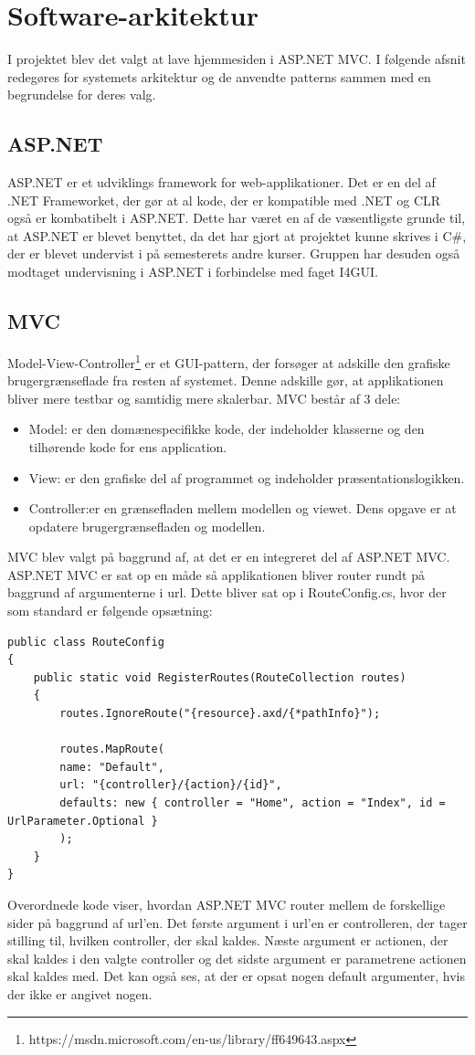 \chapter{Software-arkitektur}

I projektet blev det valgt at lave hjemmesiden i ASP.NET MVC. I følgende afsnit redegøres for systemets arkitektur og de anvendte patterns sammen med en begrundelse for deres valg.

\section{ASP.NET}
ASP.NET er et udviklings framework for web-applikationer.
Det er en del af .NET Frameworket, der gør at al kode, der er  kompatible med .NET og CLR også er kombatibelt i ASP.NET. Dette har været en af de væsentligste grunde til, at ASP.NET er blevet benyttet, da det har gjort at projektet kunne skrives i C\#, der er blevet undervist i på semesterets andre kurser. Gruppen har desuden også modtaget undervisning i ASP.NET i forbindelse med faget I4GUI.

\section{MVC}
Model-View-Controller\footnote{https://msdn.microsoft.com/en-us/library/ff649643.aspx} er et GUI-pattern, der forsøger at adskille den grafiske brugergrænseflade fra resten af systemet. Denne adskille gør, at applikationen bliver mere testbar og samtidig mere skalerbar.
MVC består af 3 dele:
\begin{itemize}
	\item Model: er den domænespecifikke kode, der indeholder klasserne og den tilhørende kode for ens application.
	\item View: er den grafiske del af programmet og indeholder præsentationslogikken.
	\item Controller:er en grænsefladen mellem modellen og viewet. Dens opgave er at opdatere brugergrænsefladen og modellen.
\end{itemize}

MVC blev valgt på baggrund af, at det er en integreret del af ASP.NET MVC. ASP.NET MVC er sat op en måde så applikationen bliver router rundt på baggrund af argumenterne i url.
Dette bliver sat op i RouteConfig.cs, hvor der som standard er følgende opsætning:
\begin{verbatim}
public class RouteConfig
{
	public static void RegisterRoutes(RouteCollection routes)
	{
		routes.IgnoreRoute("{resource}.axd/{*pathInfo}");
		
		routes.MapRoute(
		name: "Default",
		url: "{controller}/{action}/{id}",
		defaults: new { controller = "Home", action = "Index", id = UrlParameter.Optional }
		);
	}
}
\end{verbatim}
Overordnede kode	 viser, hvordan ASP.NET MVC router mellem de forskellige sider på baggrund af url'en. Det første argument i url'en er controlleren, der tager stilling til, hvilken controller, der skal kaldes. Næste argument er actionen, der skal kaldes i den valgte controller og det sidste argument er parametrene actionen skal kaldes med.
Det kan også ses, at der er opsat nogen default argumenter, hvis der ikke er angivet nogen.

